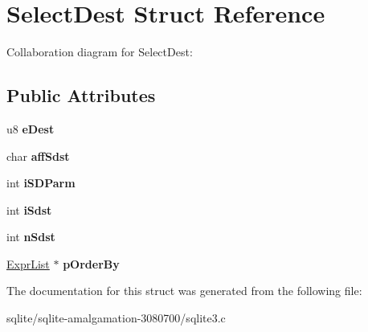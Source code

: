 \hypertarget{struct_select_dest}{\section{Select\+Dest Struct Reference}
\label{struct_select_dest}
}


Collaboration diagram for Select\+Dest\+:
\subsection*{Public Attributes}
\begin{DoxyCompactItemize}
\item 
\hypertarget{struct_select_dest_a779c1809acadd15898db0b20e31cc23f}{u8 {\bfseries e\+Dest}}\label{struct_select_dest_a779c1809acadd15898db0b20e31cc23f}

\item 
\hypertarget{struct_select_dest_a7c58e0aef1d9e1eff03a8d765e7e2395}{char {\bfseries aff\+Sdst}}\label{struct_select_dest_a7c58e0aef1d9e1eff03a8d765e7e2395}

\item 
\hypertarget{struct_select_dest_ad30d63b2b7216a533a5ea476412664aa}{int {\bfseries i\+S\+D\+Parm}}\label{struct_select_dest_ad30d63b2b7216a533a5ea476412664aa}

\item 
\hypertarget{struct_select_dest_adbc1c5f38b8c95da1d05e8c25dee400f}{int {\bfseries i\+Sdst}}\label{struct_select_dest_adbc1c5f38b8c95da1d05e8c25dee400f}

\item 
\hypertarget{struct_select_dest_aa4e7438446ef26231f7426edfda13e19}{int {\bfseries n\+Sdst}}\label{struct_select_dest_aa4e7438446ef26231f7426edfda13e19}

\item 
\hypertarget{struct_select_dest_a10881e4ffff470814a592d6d7e1541fa}{\hyperlink{struct_expr_list}{Expr\+List} $\ast$ {\bfseries p\+Order\+By}}\label{struct_select_dest_a10881e4ffff470814a592d6d7e1541fa}

\end{DoxyCompactItemize}


The documentation for this struct was generated from the following file\+:\begin{DoxyCompactItemize}
\item 
sqlite/sqlite-\/amalgamation-\/3080700/sqlite3.\+c\end{DoxyCompactItemize}
